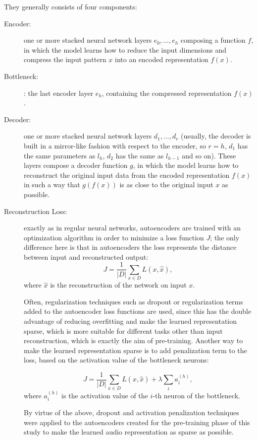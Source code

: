 They generally consists of four components:
\begin{description}
    \item[Encoder:] one or more stacked neural network layers $e_0, ..., e_h$ composing a function $f$, in which the model learns how to reduce the input dimensions and compress the input pattern $x$ into an encoded representation $f(x)$.
    
    \item[Bottleneck:]: the last encoder layer $e_h$, containing the compressed representation $f(x)$.
    
    \item[Decoder:] one or more stacked neural network layers $d_1, ..., d_r$ (usually, the decoder is built in a mirror-like fashion with respect to the encoder, so $r = h$, $d_1$ has the same parameters as $l_h$, $d_2$ has the same as $l_{h-1}$ and so on). These layers compose a decoder function $g$, in which the model learns how to reconstruct the original input data from the encoded representation $f(x)$ in such a way that $g(f(x))$ is as close to the original input $x$ as possible.
    
    \item[Reconstruction Loss:] exactly as in regular neural networks, autoencoders are trained with an optimization algorithm in order to minimize a loss function $J$; the only difference here is that in autoencoders the loss represents the distance between input and reconstructed output:
    $$
    J = \frac{1}{|D|} \sum_{x \in D} L(x, \hat{x}) \text{, }
    $$
    where $\hat{x}$ is the reconstruction of the network on input $x$.
    
    Often, regularization techniques such as dropout \cite{dropout} or regularization terms added to the autoencoder loss functions are used, since this has the double advantage of reducing overfitting and make the learned representation sparse, which is more suitable for different tasks other than input reconstruction, which is exactly the aim of pre-training. Another way to make the learned representation sparse is to add penalization term to the loss, based on the activation value of the bottleneck neurons:
    
    $$J = \frac{1}{|D|} \sum_{x \in D} L(x, \hat{x}) + \lambda \sum_i a^{(h)}_i \text{, }$$
    where $a^{(h)}_i$ is the activation value of the $i$-th neuron of the bottleneck.
    
    By virtue of the above, dropout and activation penalization techniques were applied to the autoencoders created for the pre-training phase of this study to make the learned audio representation as sparse as possible.
\end{description}